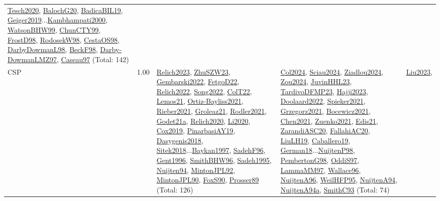 {\begin{longtable}{p{3cm}r>{\raggedright\arraybackslash}p{6cm}>{\raggedright\arraybackslash}p{6cm}>{\raggedright\arraybackslash}p{8cm}}
\hyperref[detail:Tesch2020]{Tesch2020}, \hyperref[detail:BalochG20]{BalochG20}, \hyperref[detail:BadicaBIL19]{BadicaBIL19}, \hyperref[detail:Geiger2019]{Geiger2019}...\hyperref[detail:Kambhampati2000]{Kambhampati2000}, \hyperref[detail:WatsonBHW99]{WatsonBHW99}, \hyperref[detail:ChunCTY99]{ChunCTY99}, \hyperref[detail:FrostD98]{FrostD98}, \hyperref[detail:RodosekW98]{RodosekW98}, \hyperref[detail:CestaOS98]{CestaOS98}, \hyperref[detail:DarbyDowmanL98]{DarbyDowmanL98}, \hyperref[detail:BeckF98]{BeckF98}, \hyperref[detail:Darby-DowmanLMZ97]{Darby-DowmanLMZ97}, \hyperref[detail:Caseau97]{Caseau97} (Total: 142)\\
\index{CSP}\index{CP!CSP}CSP &  1.00 & \hyperref[detail:Relich2023]{Relich2023}, \hyperref[detail:ZhuSZW23]{ZhuSZW23}, \hyperref[detail:Gembarski2022]{Gembarski2022}, \hyperref[detail:FetgoD22]{FetgoD22}, \hyperref[detail:Relich2022]{Relich2022}, \hyperref[detail:Song2022]{Song2022}, \hyperref[detail:ColT22]{ColT22}, \hyperref[detail:Lemos21]{Lemos21}, \hyperref[detail:Ortiz-Bayliss2021]{Ortiz-Bayliss2021}, \hyperref[detail:Rieber2021]{Rieber2021}, \hyperref[detail:Groleaz21]{Groleaz21}, \hyperref[detail:Rodler2021]{Rodler2021}, \hyperref[detail:Godet21a]{Godet21a}, \hyperref[detail:Relich2020]{Relich2020}, \hyperref[detail:Li2020]{Li2020}, \hyperref[detail:Cox2019]{Cox2019}, \hyperref[detail:PinarbasiAY19]{PinarbasiAY19}, \hyperref[detail:Dasygenis2018]{Dasygenis2018}, \hyperref[detail:Sitek2018]{Sitek2018}...\hyperref[detail:Baykan1997]{Baykan1997}, \hyperref[detail:SadehF96]{SadehF96}, \hyperref[detail:Gent1996]{Gent1996}, \hyperref[detail:SmithBHW96]{SmithBHW96}, \hyperref[detail:Sadeh1995]{Sadeh1995}, \hyperref[detail:Nuijten94]{Nuijten94}, \hyperref[detail:MintonJPL92]{MintonJPL92}, \hyperref[detail:MintonJPL90]{MintonJPL90}, \hyperref[detail:FoxS90]{FoxS90}, \hyperref[detail:Prosser89]{Prosser89} (Total: 126) & \hyperref[detail:Col2024]{Col2024}, \hyperref[detail:Sciau2024]{Sciau2024}, \hyperref[detail:Ziadlou2024]{Ziadlou2024}, \hyperref[detail:Zou2024]{Zou2024}, \hyperref[detail:JuvinHHL23]{JuvinHHL23}, \hyperref[detail:TardivoDFMP23]{TardivoDFMP23}, \hyperref[detail:Hajji2023]{Hajji2023}, \hyperref[detail:Doolaard2022]{Doolaard2022}, \hyperref[detail:Spieker2021]{Spieker2021}, \hyperref[detail:Grzegorz2021]{Grzegorz2021}, \hyperref[detail:Bocewicz2021]{Bocewicz2021}, \hyperref[detail:Chen2021]{Chen2021}, \hyperref[detail:Zuenko2021]{Zuenko2021}, \hyperref[detail:Edis21]{Edis21}, \hyperref[detail:ZarandiASC20]{ZarandiASC20}, \hyperref[detail:FallahiAC20]{FallahiAC20}, \hyperref[detail:LiuLH19]{LiuLH19}, \hyperref[detail:Caballero19]{Caballero19}, \hyperref[detail:German18]{German18}...\hyperref[detail:NuijtenP98]{NuijtenP98}, \hyperref[detail:PembertonG98]{PembertonG98}, \hyperref[detail:OddiS97]{OddiS97}, \hyperref[detail:LammaMM97]{LammaMM97}, \hyperref[detail:Wallace96]{Wallace96}, \hyperref[detail:NuijtenA96]{NuijtenA96}, \hyperref[detail:WeilHFP95]{WeilHFP95}, \hyperref[detail:NuijtenA94]{NuijtenA94}, \hyperref[detail:NuijtenA94a]{NuijtenA94a}, \hyperref[detail:SmithC93]{SmithC93} (Total: 74) & \hyperref[detail:Liu2023]{Liu2023}, 
\end{longtable}}
